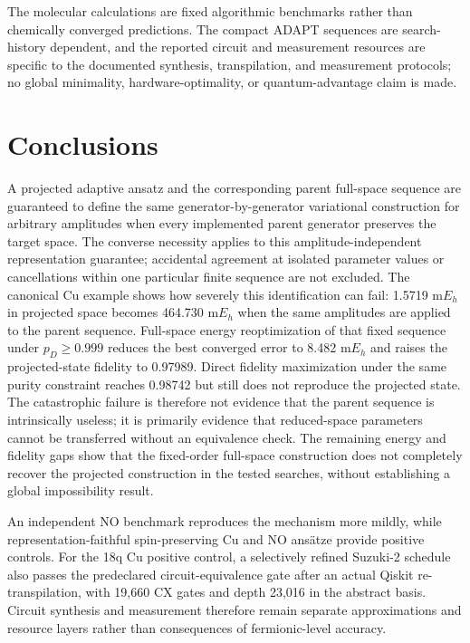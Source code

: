 \documentclass[
 aip,
 jcp,
 amsmath,amssymb,
 preprint
]{revtex4-2}
\begin{document}
The molecular calculations are fixed algorithmic benchmarks rather than chemically converged predictions.
The compact ADAPT sequences are search-history dependent, and the reported circuit and measurement resources are specific to the documented synthesis, transpilation, and measurement protocols; no global minimality, hardware-optimality, or quantum-advantage claim is made.

\section{Conclusions}

A projected adaptive ansatz and the corresponding parent full-space sequence are guaranteed to define the same generator-by-generator variational construction for arbitrary amplitudes when every implemented parent generator preserves the target space.
The converse necessity applies to this amplitude-independent representation guarantee; accidental agreement at isolated parameter values or cancellations within one particular finite sequence are not excluded.
The canonical Cu example shows how severely this identification can fail: 1.5719 m$E_h$ in projected space becomes 464.730 m$E_h$ when the same amplitudes are applied to the parent sequence.
Full-space energy reoptimization of that fixed sequence under $p_D\ge0.999$ reduces the best converged error to 8.482 m$E_h$ and raises the projected-state fidelity to 0.97989.
Direct fidelity maximization under the same purity constraint reaches 0.98742 but still does not reproduce the projected state.
The catastrophic failure is therefore not evidence that the parent sequence is intrinsically useless; it is primarily evidence that reduced-space parameters cannot be transferred without an equivalence check.
The remaining energy and fidelity gaps show that the fixed-order full-space construction does not completely recover the projected construction in the tested searches, without establishing a global impossibility result.

An independent NO benchmark reproduces the mechanism more mildly, while representation-faithful spin-preserving Cu and NO ans\"atze provide positive controls.
For the 18q Cu positive control, a selectively refined Suzuki-2 schedule also passes the predeclared circuit-equivalence gate after an actual Qiskit re-transpilation, with 19,660 CX gates and depth 23,016 in the abstract basis.
Circuit synthesis and measurement therefore remain separate approximations and resource layers rather than consequences of fermionic-level accuracy.
\end{document}
